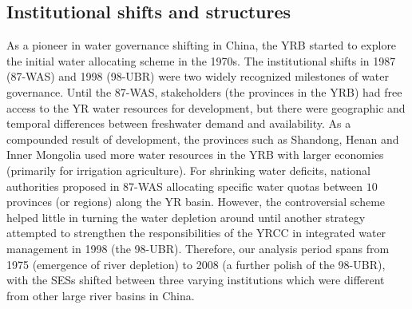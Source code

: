 
\subsection{Institutional shifts and structures}
\label{results-1}

As a pioneer in water governance shifting in China, the YRB started to explore the initial water allocating scheme in the 1970s.
The institutional shifts in 1987 (87-WAS) and 1998 (98-UBR) were two widely recognized milestones of water governance.
Until the 87-WAS, stakeholders (the provinces in the YRB) had free access to the YR water resources for development, but there were geographic and temporal differences between freshwater demand and availability.
As a compounded result of development, the provinces such as Shandong, Henan and Inner Mongolia used more water resources in the YRB with larger economies (primarily for irrigation agriculture).
For shrinking water deficits, national authorities proposed in 87-WAS allocating specific water quotas between $10$ provinces (or regions) along the YR basin.
However, the controversial scheme helped little in turning the water depletion around until another strategy attempted to strengthen the responsibilities of the YRCC in integrated water management in 1998 (the 98-UBR).
Therefore, our analysis period spans from 1975 (emergence of river depletion) to 2008 (a further polish of the 98-UBR), with the SESs shifted between three varying institutions which were different from other large river basins in China.


